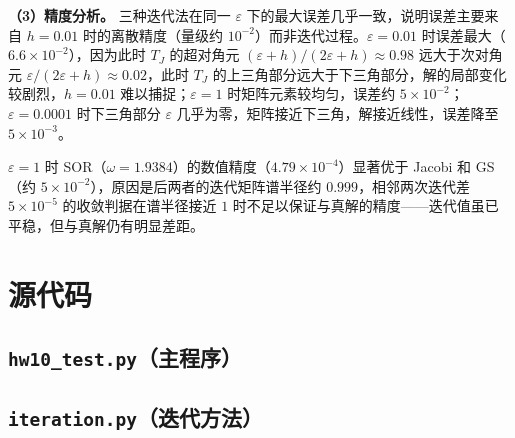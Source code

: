 \documentclass[10pt, a4paper]{article}
\begin{document}
\textbf{（3）精度分析。}
三种迭代法在同一 $\varepsilon$ 下的最大误差几乎一致，说明误差主要来自 $h=0.01$ 时的离散精度（量级约 $10^{-2}$）而非迭代过程。$\varepsilon=0.01$ 时误差最大（$6.6\times10^{-2}$），因为此时 $T_J$ 的超对角元 $(\varepsilon+h)/(2\varepsilon+h)\approx0.98$ 远大于次对角元 $\varepsilon/(2\varepsilon+h)\approx0.02$，此时 $T_J$ 的上三角部分远大于下三角部分，解的局部变化较剧烈，$h=0.01$ 难以捕捉；$\varepsilon=1$ 时矩阵元素较均匀，误差约 $5\times10^{-2}$；$\varepsilon=0.0001$ 时下三角部分 $\varepsilon$ 几乎为零，矩阵接近下三角，解接近线性，误差降至 $5\times10^{-3}$。

$\varepsilon=1$ 时 SOR（$\omega=1.9384$）的数值精度（$4.79\times10^{-4}$）显著优于 Jacobi 和 GS（约 $5\times10^{-2}$），原因是后两者的迭代矩阵谱半径约 $0.999$，相邻两次迭代差 $5\times10^{-5}$ 的收敛判据在谱半径接近 $1$ 时不足以保证与真解的精度——迭代值虽已平稳，但与真解仍有明显差距。

\appendix
\section{源代码}

\subsection{\texttt{hw10\_test.py}（主程序）}


\subsection{\texttt{iteration.py}（迭代方法）}

\end{document}
